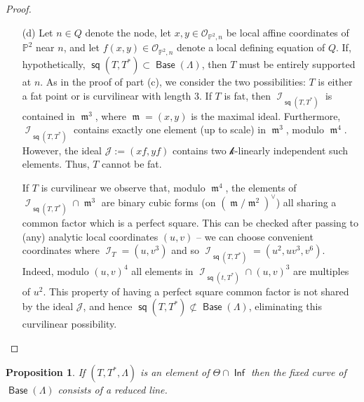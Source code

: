 \documentclass[reqno, 11pt]{amsart}
\theoremstyle{plain}
\newtheorem{proposition}[theorem]{Proposition}
\theoremstyle{remark}
\renewcommand{\P}{\mathbb{P}}
\renewcommand{\k}{\mathscr{k}}
\DeclareMathOperator{\I}{\mathcal{I}}
\renewcommand{\O}{\mathcal{O}}
\DeclareMathOperator{\s}{\mathsf{sq}}
\DeclareMathOperator{\Inf}{\mathsf{Inf}}
\DeclareMathOperator{\Base}{\mathsf{Base}}
\DeclareMathOperator{\m}{\mathfrak{m}}
\begin{document}
\begin{proof}
\begin{enumerate}
        On the other hand, if $T$ is curvilinear a calculation as in the proof of part (b) implies that, modulo $\m^{3}$, $\I_{\s(T,T^{*})} \cap \m^{2}$ consists of a single quadratic form on $(\m/\m^{2})^{\vee}$ up to scaling. However, $\mathcal{J} \cap \m^{2}$ has two linearly independent quadratic forms modulo $\m^{3}$, and thus again $\s(T,T^{*}) \not\subset \Base (\Lambda)$. So our hypothetical situation is impossible, as we needed to show.

        \item[(d)] Let $n \in Q$ denote the node, let $x,y \in \O_{\P^{2},n}$ be local affine coordinates of $\P^{2}$ near $n$, and let $f(x,y) \in \O_{\P^{2},n}$ denote a local defining equation of $Q$.  If, hypothetically, $\s(T,T^{*}) \subset \Base (\Lambda)$, then $T$ must be entirely supported at $n$.  As in the proof of part (c), we consider the two possibilities: $T$ is either a fat point or is curvilinear with length $3$.  If $T$ is fat, then $\I_{\s(T,T^{*})}$ is contained in $\m^{3}$, where $\m = (x,y)$ is the maximal ideal. Furthermore, $\I_{\s(T,T^{*})}$ contains exactly one element (up to scale) in $\m^{3}$, modulo $\m^{4}$. However, the ideal $\mathcal{J} := (xf,yf)$ contains two $\k$-linearly independent such elements. Thus, $T$ cannot be fat.  

        If $T$ is curvilinear we observe that, modulo $\m^{4}$, the elements of $\I_{\s(T,T^{*})} \cap \m^{3}$ are binary cubic forms (on $(\m/\m^{2})^{\vee}$) all sharing a common factor which is a perfect square. This can be checked after passing to (any) analytic local coordinates $(u,v)$ -- we can choose convenient coordinates where $\I_{T} = (u,v^{3})$ and so $\I_{\s(T,T^{*})} = (u^2, uv^3,v^6)$.  Indeed, modulo $(u,v)^4$ all elements in $\I_{\s(t,T^{*})} \cap (u,v)^{3}$  are multiples of $u^{2}$.  This property of having a perfect square common factor is not shared by the ideal $\mathcal{J}$, and hence $\s(T,T^*) \not\subset \Base (\Lambda)$, eliminating this curvilinear possibility.
        \end{enumerate}
\end{proof}



\begin{proposition}
  \label{proposition:infline} If $(T,T^{*},\Lambda)$  is an element of $\Theta \cap \Inf$ then
  the fixed curve of $\Base(\Lambda)$ consists of a reduced
  line.
\end{proposition}
\end{document}
